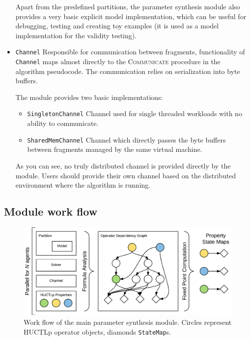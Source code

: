 \begin{itemize}
	Apart from the predefined partitions, the parameter synthesis module also provides a very basic explicit model implementation, which can be useful for debugging, testing and creating toy examples (it is used as a model implementation for the validity testing).

	\item \texttt{Channel} Responsible for communication between fragments, functionality of \texttt{Channel} maps almost directly to the \textsc{Communicate} procedure in the algorithm pseudocode. The communication relies on serialization into byte buffers.
	
	The module provides two basic implementations:
	
	\begin{itemize}
		\item \texttt{SingletonChannel} Channel used for single threaded workloads with no ability to communicate.
		\item \texttt{SharedMemChannel} Channel which directly passes the byte buffers between fragments managed by the same virtual machine.
	\end{itemize}

	As you can see, no truly distributed channel is provided directly by the module. Users should provide their own channel based on the distributed environment where the algorithm is running.

\end{itemize}

\subsection{Module work flow}

\begin{figure}[]
	\centering
	\includegraphics[scale=0.45]{media/core_workflow.pdf}
	\caption{Work flow of the main parameter synthesis module. Circles represent \ac{HUCTLp} operator objects, diamonds \texttt{StateMap}s. }
	\label{fig:core_workflow}
\end{figure}

